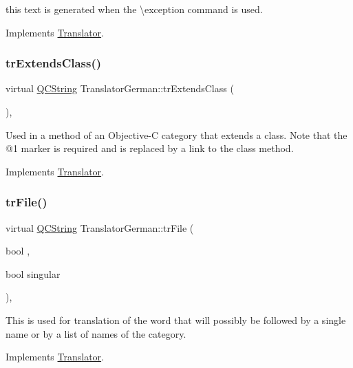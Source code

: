 this text is generated when the \textbackslash{}exception command is used. 

Implements \mbox{\hyperlink{class_translator}{Translator}}.

\mbox{\label{class_translator_german_a6c9ec7a1d0ca7960b780aec8776c7783}} 
\subsubsection{\texorpdfstring{trExtendsClass()}{trExtendsClass()}}
{\footnotesize\ttfamily virtual \mbox{\hyperlink{class_q_c_string}{Q\+C\+String}} Translator\+German\+::tr\+Extends\+Class (\begin{DoxyParamCaption}{ }\end{DoxyParamCaption})\hspace{0.3cm}{\ttfamily [inline]}, {\ttfamily [virtual]}}

Used in a method of an Objective-\/C category that extends a class. Note that the @1 marker is required and is replaced by a link to the class method. 

Implements \mbox{\hyperlink{class_translator}{Translator}}.

\mbox{\label{class_translator_german_a395c5b6625eec8a81089f4659dca9243}} 
\subsubsection{\texorpdfstring{trFile()}{trFile()}}
{\footnotesize\ttfamily virtual \mbox{\hyperlink{class_q_c_string}{Q\+C\+String}} Translator\+German\+::tr\+File (\begin{DoxyParamCaption}\item[{bool}]{,  }\item[{bool}]{singular }\end{DoxyParamCaption})\hspace{0.3cm}{\ttfamily [inline]}, {\ttfamily [virtual]}}

This is used for translation of the word that will possibly be followed by a single name or by a list of names of the category. 

Implements \mbox{\hyperlink{class_translator}{Translator}}.

